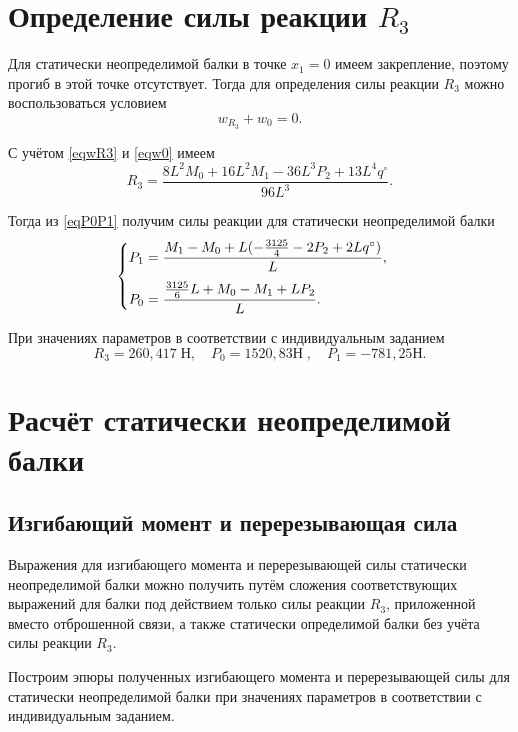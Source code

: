 \documentclass[12pt, a4paper]{article}
\begin{document}
	\section{Определение силы реакции $R_3$} 
	
	Для статически неопределимой балки в точке $x_1 = 0$ имеем закрепление, поэтому  прогиб в этой точке отсутствует. Тогда для определения силы реакции $R_3$ можно воспользоваться условием 
	\[
	w_{R_3} + w_0 = 0.
	\]
	
	С учётом \eqref{eqwR3} и \eqref{eqw0} имеем
	\begin{equation*}
		R_3 = \dfrac{8 L^2 M_0 + 16 L^2 M_1 - 36 L^3 P_2 + 13 L^4 q^{\circ}}{96 L^3}.
	\end{equation*}
	
	Тогда из \eqref{eqP0P1} получим силы реакции для статически неопределимой балки
	\begin{equation*}
		\begin{cases}\vspace{0.75em}
			P_1 = \dfrac{M_1 - M_0 + L (-\frac{3125}{4} - 2 P_2 + 2 L  q^{\circ})}{L}, \\
			P_0 = \dfrac{\frac{3125}{6} L + M_0 - M_1 + L P_2}{L}.\\
		\end{cases}
	\end{equation*}
	
	При значениях параметров в соответствии с индивидуальным заданием
	\vspace{-0.5em}
	\[
	R_3 = 260,417 \; \text{Н}, \quad P_0 = 1520,83 \text{Н}\;, \quad P_1 = -781,25 \text{Н}.
	\]
	
	\vspace{-1.5em}
	
	\section{Расчёт статически неопределимой балки}
	\subsection{Изгибающий момент и перерезывающая сила}
	
	Выражения для изгибающего момента и перерезывающей силы статически неопределимой балки можно получить путём сложения соответствующих выражений для балки под действием только силы реакции $R_3$, приложенной вместо отброшенной связи, а также статически определимой балки без учёта силы реакции $R_3$. 
	
	Построим эпюры полученных изгибающего момента и перерезывающей силы для статически неопределимой балки при значениях параметров в соответствии с индивидуальным заданием.
	
\end{document}
